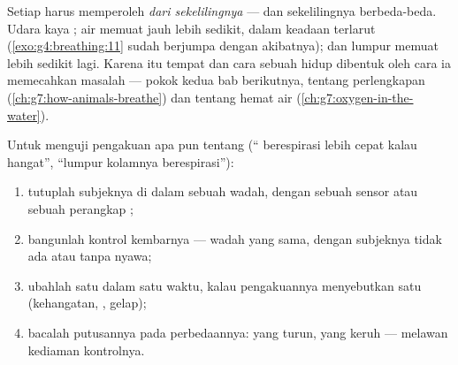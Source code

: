 \begin{proposition}\label{prop:g7:what-is-respiration:habitats}
Setiap  harus memperoleh  \emph{dari
sekelilingnya} --- dan sekelilingnya berbeda-beda. Udara kaya ;
air memuat jauh lebih sedikit, dalam keadaan terlarut
(\cref{exo:g4:breathing:11} sudah berjumpa dengan akibatnya); 
dan lumpur memuat lebih sedikit lagi. Karena itu tempat dan cara
sebuah  hidup dibentuk oleh cara ia memecahkan masalah
 --- pokok kedua bab berikutnya, tentang perlengkapan 
(\cref{ch:g7:how-animals-breathe}) dan tentang hemat air
(\cref{ch:g7:oxygen-in-the-water}).
\end{proposition}
\admitted

\begin{method}\label{met:g7:what-is-respiration:test}
Untuk menguji pengakuan apa pun tentang  (`` berespirasi
lebih cepat kalau hangat'', ``lumpur kolamnya berespirasi''):
\begin{enumerate}
  \item tutuplah subjeknya di dalam sebuah wadah, dengan sebuah sensor
         atau sebuah perangkap ;
  \item bangunlah kontrol kembarnya --- wadah yang sama, dengan
        subjeknya tidak ada atau tanpa nyawa;
  \item ubahlah satu  dalam satu waktu, kalau pengakuannya
        menyebutkan satu  (kehangatan, , gelap);
  \item bacalah putusannya pada perbedaannya:  yang turun,  yang keruh --- melawan kediaman kontrolnya.
\end{enumerate}
\end{method}

